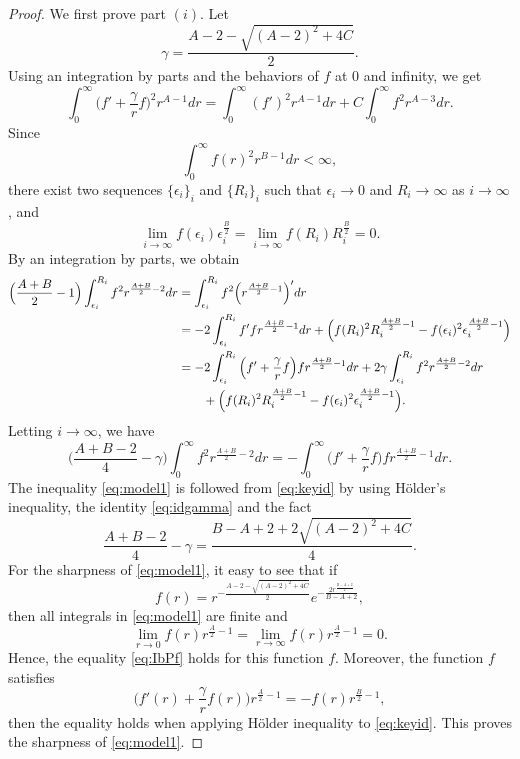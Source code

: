 \documentclass[a4paper,12pt]{article}
\theoremstyle{plain}
\theoremstyle{definition}
\theoremstyle{remark}
\def\ep{\epsilon}%
\numberwithin{equation}{section}
\begin{document}
\begin{proof}
We first prove part $(i)$. Let 
\[
\gamma = \frac{A-2 - \sqrt{(A-2)^2 + 4C}}2.
\]
Using an integration by parts and the behaviors of $f$ at $0$ and infinity, we get
\begin{equation}\label{eq:idgamma}
\int_0^\infty\Big(f' + \frac{\gamma}r f\Big)^2 r^{A-1} dr = \int_0^\infty (f')^2 r^{A -1} dr + C \int_0^\infty f^2 r^{A -3} dr.
\end{equation}
Since 
\[
\int_0^\infty f(r)^2 r^{B-1} dr < \infty,
\]
 there exist two sequences $\{\epsilon_i\}_i$ and $\{R_i\}_i$ such that $\epsilon_i \to 0$ and $R_i \to \infty$ as $i\to \infty$, and
\[
\lim_{i\to \infty} f(\ep_i) \ep_i^{\frac B2} = \lim_{i\to \infty} f(R_i) R_i^{\frac B2} = 0.
\]
By an  integration by parts,  we obtain
\begin{align}\label{eq:IbPf}
\Big(\frac{A+B}2 -1\Big)\int_{\ep_i}^{R_i} f^2 r^{\frac{A+B}2-2} dr& = \int_{\ep_i}^{R_i} f^2 \Big(r^{\frac{A+B}2-1}\Big)' dr\notag\\
& = -2\int_{\ep_i}^{R_i} f' f r^{\frac{A+B}2-1} dr + \Big(f(R_i)^2 R_i^{\frac{A+B}2-1} -f(\ep_i)^2 \ep_i^{\frac{A+B}2-1}\Big)\notag\\
& = -2 \int_{\ep_i}^{R_i}\Big(f' + \frac{\gamma}r f\Big) f r^{\frac{A+B}2-1} dr + 2\gamma \int_{\ep_i}^{R_i} f^2 r^{\frac{A+B}2-2} dr\notag\\
&\qquad + \Big(f(R_i)^2 R_i^{\frac{A+B}2-1} -f(\ep_i)^2 \ep_i^{\frac{A+B}2-1}\Big).
\end{align}
Letting $i\to \infty$, we have
\begin{equation}\label{eq:keyid}
\Big(\frac{A+B-2}4 - \gamma\Big)\int_0^\infty f^2 r^{\frac{A+B}2-2} dr = -\int_0^\infty \Big(f' + \frac{\gamma}r f\Big) f r^{\frac{A+B}2-1} dr.
\end{equation}
The inequality \eqref{eq:model1} is followed from \eqref{eq:keyid} by using H\"older's  inequality, the identity \eqref{eq:idgamma} and the fact
\[
\frac{A+B-2}4 - \gamma = \frac{B-A+2 + 2\sqrt{(A-2)^2 + 4C}}4.
\]
For the sharpness of \eqref{eq:model1}, it easy to see that if 
\[
f(r) = r^{-\frac{A-2 - \sqrt{(A-2)^2 + 4C}}2} e^{-\frac{2r^{\frac{B-A+2}2}}{B-A+2}},
\]
then all integrals in \eqref{eq:model1} are finite  and 
\[
\lim_{r\to 0} f(r)r^{\frac{A}2 -1} = \lim_{r\to \infty} f(r) r^{\frac{A}2 -1} = 0.
\]
Hence, the equality \eqref{eq:IbPf} holds for this function $f$. Moreover, the function $f$ satisfies
\[
\Big(f'(r) + \frac{\gamma}r f(r)\Big) r^{\frac{A}2 -1} = -f(r) r^{\frac B2 -1},
\]
then the equality holds when applying H\"older inequality to \eqref{eq:keyid}. This proves the sharpness of \eqref{eq:model1}.


\end{proof}
\end{document}
